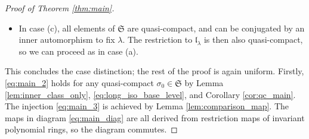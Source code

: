 \documentclass{amsart}
\newcommand{\C}{\mathbb{C}}
\newcommand{\el}{\mathfrak{l}}
\newcommand{\Z}{\mathbb{Z}}
\newcommand{\inv}{^{-1}}
\theoremstyle{definition}
\theoremstyle{plain}
\theoremstyle{remark}
\begin{document}
\begin{proof}[Proof of Theorem \ref{thm:main}]
\begin{itemize}
        The Cartan involution $A\mapsto (A^t)\inv$ acts as $-1$ on a Cartan subalgebra, so Lemma \ref{lem:from_eq_coh_to_invrings} and Theorem \ref{thm:CRT} imply that $\sigma^*$ acts on homogeneous elements by multiplication with $(-1)^{\deg}$. The coinvariant ring is then isomorphic to
        $$
            \C[x_1,\ldots, x_k, y_1,\ldots, y_{2n+1-k}]^{S_k\times S_{2n+1-k}
            \times \Z_2^{2n+1}},
        $$
        with $\Z_2^{2n+1}$ acting by sign changes on the variables. But a computation similar to that in Example \ref{expl:typeAexpl} identifies that ring with $H^{2*}_{L_k^\sigma}$, proving \eqref{eq:main_proof_part_1} for this case.
        
        \item In case (c), all elements of $\mathfrak{S}$ are quasi-compact, and can be conjugated by an inner automorphism to fix $\lambda$. The restriction to $\el_\lambda$ is then also quasi-compact, so we can proceed as in case (a).
    \end{itemize}

    This concludes the case distinction; the rest of the proof is again uniform. Firstly, \eqref{eq:main_2} holds for any quasi-compact $\sigma_0\in \mathfrak{S}$ by Lemma \ref{lem:inner_class_only}, \eqref{eq:long_iso_base_level}, and Corollary \ref{cor:qc_main}. The injection \eqref{eq:main_3} is achieved by Lemma \ref{lem:comparison_map}. The maps in diagram \eqref{eq:main_diag} are all derived from restriction maps of invariant polynomial rings, so the diagram commutes.
\end{proof}
\end{document}
